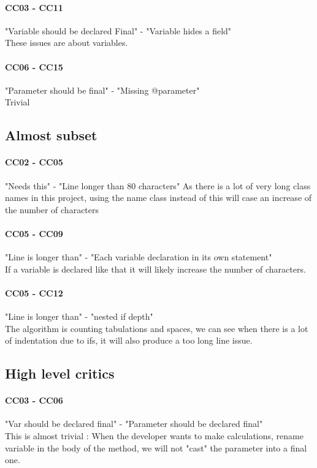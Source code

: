\documentclass{article}
\begin{document}
\paragraph{CC03 - CC11} 
"Variable should be declared Final" -  "Variable hides a field" \\
These issues are about variables.

\paragraph{CC06 - CC15} 
"Parameter should be final" - "Missing @parameter" \\
Trivial

\subsection{Almost subset}
\paragraph{CC02 - CC05} 
"Needs this" - "Line longer than 80 characters"
As there is a lot of very long class names in this project, using the name class instead of this will case an increase of the number of characters
\paragraph{CC05 - CC09} 
 "Line is longer than" -  "Each variable declaration in its own statement" \\
If a variable is declared like that it will likely increase the number of characters.
\paragraph{CC05 - CC12} 
"Line is longer than" -  "nested if depth"\\
The algorithm is counting tabulations and spaces, we can see when there is a lot of indentation due to ifs, it will also produce a too long line issue.


\subsection{High level critics}
\paragraph{CC03  - CC06} 
"Var should be declared final" - "Parameter should be declared final" \\
This is almost trivial : When the developer wants to make calculations, rename variable in the body of the method, we will not "cast" the parameter into a final one.
\end{document}
